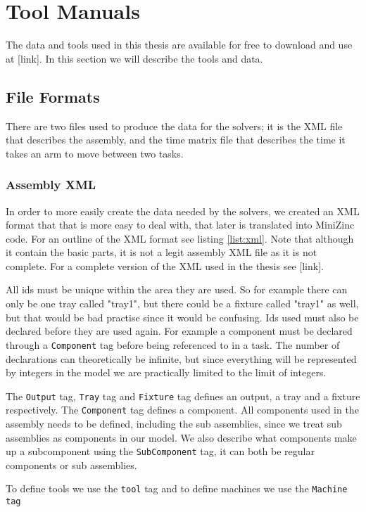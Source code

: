 \chapter{Tool Manuals}\label{app:tool_manuals}
The data and tools used in this thesis are available for free to download and use at [link]. In this section we will describe the tools and data.

\section{File Formats}
There are two files used to produce the data for the solvers; it is the XML file that describes the assembly, and the time matrix file that describes the time it takes an arm to move between two tasks.
\subsection{Assembly XML}
In order to more easily create the data needed by the solvers, we created an XML format that that is more easy to deal with, that later is translated into MiniZinc code. For an outline of the XML format see listing \ref{list:xml}. Note that although it contain the basic parts, it is not a legit assembly XML file as it is not complete. For a complete version of the XML used in the thesis see [link].

All ids must be unique within the area they are used. So for example there can only be one tray called "tray1", but there could be a fixture called "tray1" as well, but that would be bad practise since it would be confusing. Ids used must also be declared before they are used again. For example a component must be declared through a \texttt{Component} tag before being referenced to in a task. The number of declarations can theoretically be infinite, but since everything will be represented by integers in the model we are practically limited to the limit of integers.

The \texttt{Output} tag, \texttt{Tray} tag and \texttt{Fixture} tag defines an output, a tray and a fixture respectively. The \texttt{Component} tag defines a component. All components used in the assembly needs to be defined, including the sub assemblies, since we treat sub assemblies as components in our model. We also describe what components make up a subcomponent using the \texttt{SubComponent} tag, it can both be regular components or sub assemblies.

To define tools we use the \texttt{tool} tag and to define machines we use the \texttt{Machine tag}

